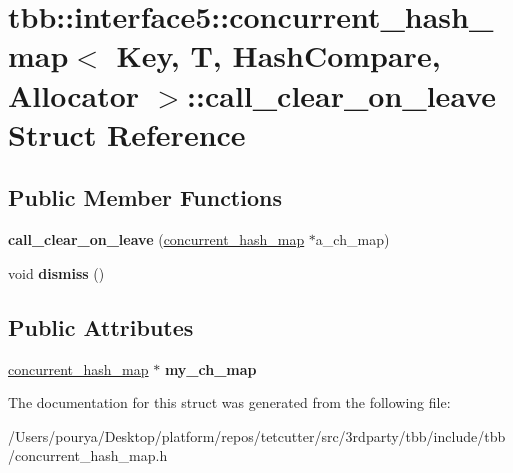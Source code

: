 \hypertarget{structtbb_1_1interface5_1_1concurrent__hash__map_1_1call__clear__on__leave}{}\section{tbb\+:\+:interface5\+:\+:concurrent\+\_\+hash\+\_\+map$<$ Key, T, Hash\+Compare, Allocator $>$\+:\+:call\+\_\+clear\+\_\+on\+\_\+leave Struct Reference}
\label{structtbb_1_1interface5_1_1concurrent__hash__map_1_1call__clear__on__leave}
\subsection*{Public Member Functions}
\begin{DoxyCompactItemize}
\item 
\hypertarget{structtbb_1_1interface5_1_1concurrent__hash__map_1_1call__clear__on__leave_a63e24851be4411b4f18a09880cff0e6a}{}{\bfseries call\+\_\+clear\+\_\+on\+\_\+leave} (\hyperlink{classtbb_1_1interface5_1_1concurrent__hash__map}{concurrent\+\_\+hash\+\_\+map} $\ast$a\+\_\+ch\+\_\+map)\label{structtbb_1_1interface5_1_1concurrent__hash__map_1_1call__clear__on__leave_a63e24851be4411b4f18a09880cff0e6a}

\item 
\hypertarget{structtbb_1_1interface5_1_1concurrent__hash__map_1_1call__clear__on__leave_ae3db544acd85683408c5e77ab29b3c7b}{}void {\bfseries dismiss} ()\label{structtbb_1_1interface5_1_1concurrent__hash__map_1_1call__clear__on__leave_ae3db544acd85683408c5e77ab29b3c7b}

\end{DoxyCompactItemize}
\subsection*{Public Attributes}
\begin{DoxyCompactItemize}
\item 
\hypertarget{structtbb_1_1interface5_1_1concurrent__hash__map_1_1call__clear__on__leave_a07810c1e62c04cf11a8e09fea7cb1648}{}\hyperlink{classtbb_1_1interface5_1_1concurrent__hash__map}{concurrent\+\_\+hash\+\_\+map} $\ast$ {\bfseries my\+\_\+ch\+\_\+map}\label{structtbb_1_1interface5_1_1concurrent__hash__map_1_1call__clear__on__leave_a07810c1e62c04cf11a8e09fea7cb1648}

\end{DoxyCompactItemize}


The documentation for this struct was generated from the following file\+:\begin{DoxyCompactItemize}
\item 
/\+Users/pourya/\+Desktop/platform/repos/tetcutter/src/3rdparty/tbb/include/tbb/concurrent\+\_\+hash\+\_\+map.\+h\end{DoxyCompactItemize}
